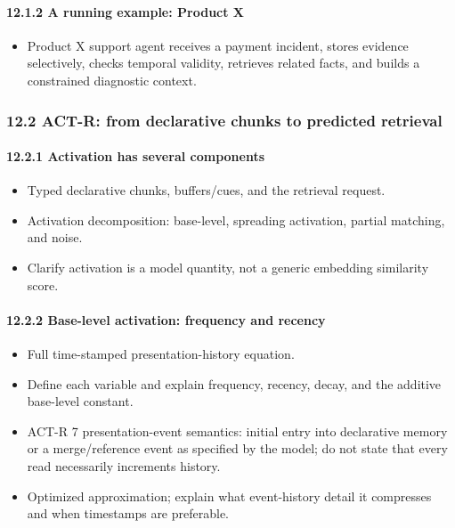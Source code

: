 \paragraph{12.1.2 A running example: Product X}\label{1212-a-running-example-product-x}

\begin{itemize}
\tightlist
\item
  Product X support agent receives a payment incident, stores evidence selectively, checks temporal validity, retrieves related facts, and builds a constrained diagnostic context.
\end{itemize}

\subsubsection{12.2 ACT-R: from declarative chunks to predicted retrieval}\label{122-act-r-from-declarative-chunks-to-predicted-retrieval}

\paragraph{12.2.1 Activation has several components}\label{1221-activation-has-several-components}

\begin{itemize}
\tightlist
\item
  Typed declarative chunks, buffers/cues, and the retrieval request.
\item
  Activation decomposition: base-level, spreading activation, partial matching, and noise.
\item
  Clarify activation is a model quantity, not a generic embedding similarity score.
\end{itemize}

\paragraph{12.2.2 Base-level activation: frequency and recency}\label{1222-base-level-activation-frequency-and-recency}

\begin{itemize}
\tightlist
\item
  Full time-stamped presentation-history equation.
\item
  Define each variable and explain frequency, recency, decay, and the additive base-level constant.
\item
  ACT-R 7 presentation-event semantics: initial entry into declarative memory or a merge/reference event as specified by the model; do not state that every read necessarily increments history.
\item
  Optimized approximation; explain what event-history detail it compresses and when timestamps are preferable.
\end{itemize}

